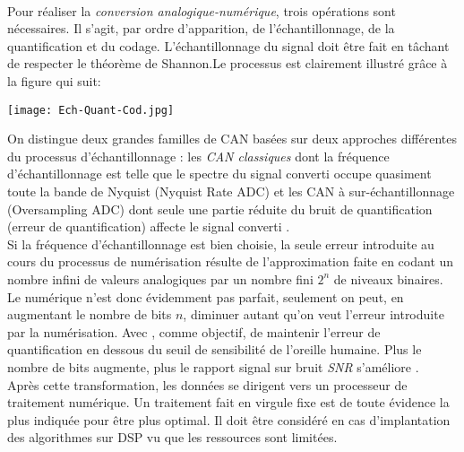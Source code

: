 \paragraph{}
Pour réaliser la \emph{conversion analogique-numérique}, trois opérations sont nécessaires. Il s'agit, par ordre d'apparition, de l'échantillonnage, de la quantification et du codage. L'échantillonnage du signal doit être fait en tâchant de respecter le théorème de Shannon.Le processus est clairement illustré grâce à la figure qui suit:\newpage
\begin{center}
\texttt{[image: Ech-Quant-Cod.jpg]}
\end{center}
On distingue deux grandes familles de CAN basées sur deux approches différentes du processus d'échantillonnage : les \emph{CAN classiques} dont la fréquence d'échantillonnage est telle que le
spectre du signal converti occupe quasiment toute la bande de Nyquist (Nyquist Rate ADC) et
les CAN à sur-échantillonnage (Oversampling ADC) dont seule une partie réduite du bruit de
quantification (erreur de quantification) affecte le signal converti \cite{CoursConv}.\\
Si la fréquence d'échantillonnage est bien choisie, la seule erreur introduite au cours du processus de
numérisation résulte de l'approximation faite en codant un nombre infini de valeurs analogiques par un
nombre fini $ 2^{n} $ de niveaux binaires. Le numérique n'est donc évidemment pas parfait, seulement on peut, en augmentant le nombre de bits $ n $, diminuer autant qu'on veut l'erreur introduite par la
numérisation. Avec , comme objectif, de maintenir l'erreur de quantification en dessous du seuil
de sensibilité de l'oreille humaine. Plus le nombre de bits augmente, plus le rapport signal sur bruit \emph{SNR} s'améliore \cite{Ponge}.\\
Après cette transformation, les données se dirigent vers un processeur de traitement numérique. Un traitement fait en virgule fixe est de toute évidence la plus indiquée pour être plus optimal. Il doit être considéré en cas d'implantation des algorithmes sur DSP vu que les ressources sont limitées.
